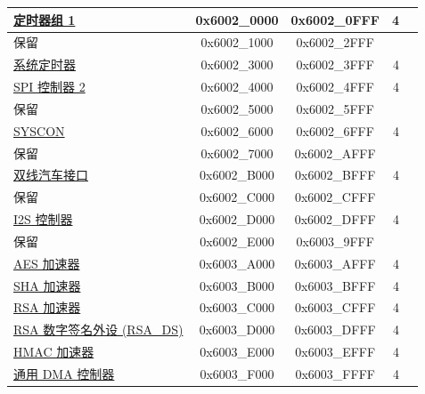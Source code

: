 \begin{longtable}[c]{ |p{5cm}|c|c|r|p{1.0cm}| }
                        \hyperref[mod:timg]{定时器组 1}              & 0x6002\_0000 & 0x6002\_0FFF &   4    &   \\\hline
    \rowcolor{gray!25}  保留                    & 0x6002\_1000 & 0x6002\_2FFF &        &   \\\hline
                        \hyperref[mod:systimer]{系统定时器}              & 0x6002\_3000 & 0x6002\_3FFF &   4    &   \\\hline
                        \hyperref[mod:spi]{SPI 控制器 2}            & 0x6002\_4000 & 0x6002\_4FFF &   4    &   \\\hline
    \rowcolor{gray!25}  保留                    & 0x6002\_5000 & 0x6002\_5FFF &        &   \\\hline
                        \hyperref[mod:permctrl]{SYSCON}              & 0x6002\_6000 & 0x6002\_6FFF &   4    &   \\\hline
    \rowcolor{gray!25}  保留                    & 0x6002\_7000 & 0x6002\_AFFF &        &   \\\hline
                        \hyperref[mod:twai]{双线汽车接口}            & 0x6002\_B000 & 0x6002\_BFFF &   4    &   \\\hline
    \rowcolor{gray!25}  保留                    & 0x6002\_C000 & 0x6002\_CFFF &        &   \\\hline
                        \hyperref[mod:i2s]{I2S 控制器}              & 0x6002\_D000 & 0x6002\_DFFF &   4    &   \\\hline
    \rowcolor{gray!25}  保留                    & 0x6002\_E000 & 0x6003\_9FFF &        &   \\\hline

                        \hyperref[mod:aes]{AES 加速器}              & 0x6003\_A000 & 0x6003\_AFFF &   4    &   \\\hline
                        \hyperref[mod:sha]{SHA 加速器}              & 0x6003\_B000 & 0x6003\_BFFF &   4    &   \\\hline
                        \hyperref[mod:rsa]{RSA 加速器}              & 0x6003\_C000 & 0x6003\_CFFF &   4    &   \\\hline
                        \hyperref[mod:digsig]{RSA 数字签名外设 (RSA\_DS)}                & 0x6003\_D000 & 0x6003\_DFFF &   4    &   \\\hline
                        \hyperref[mod:hmac]{HMAC 加速器}             & 0x6003\_E000 & 0x6003\_EFFF &   4    &   \\\hline
                        \hyperref[mod:dma]{通用 DMA 控制器}         & 0x6003\_F000 & 0x6003\_FFFF &   4    &   \\\hline


\end{longtable}
